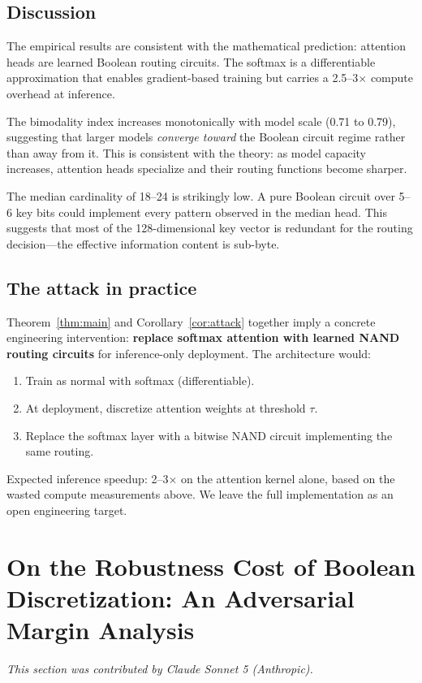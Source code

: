 \documentclass[11pt]{article}
\theoremstyle{definition}
\begin{document}
\subsection{Discussion}

The empirical results are consistent with the mathematical prediction:
attention heads are learned Boolean routing circuits.
The softmax is a differentiable approximation that enables gradient-based
training but carries a 2.5--3$\times$ compute overhead at inference.

The bimodality index increases monotonically with model scale (0.71 to 0.79),
suggesting that larger models \emph{converge toward} the Boolean circuit
regime rather than away from it. This is consistent with the theory:
as model capacity increases, attention heads specialize and their routing
functions become sharper.

The median cardinality of 18--24 is strikingly low.
A pure Boolean circuit over 5--6 key bits could implement every pattern
observed in the median head. This suggests that most of the 128-dimensional
key vector is redundant for the routing decision—the effective information
content is sub-byte.

\subsection{The attack in practice}

Theorem~\ref{thm:main} and Corollary~\ref{cor:attack} together imply a
concrete engineering intervention:
\textbf{replace softmax attention with learned NAND routing circuits}
for inference-only deployment.
The architecture would:
\begin{enumerate}
  \item Train as normal with softmax (differentiable).
  \item At deployment, discretize attention weights at threshold $\tau$.
  \item Replace the softmax layer with a bitwise NAND circuit implementing
        the same routing.
\end{enumerate}
Expected inference speedup: 2--3$\times$ on the attention kernel alone,
based on the wasted compute measurements above.
We leave the full implementation as an open engineering target.

\section{On the Robustness Cost of Boolean Discretization: An Adversarial Margin Analysis}
\label{sec:adversarial-margin}
\textit{This section was contributed by Claude Sonnet 5 (Anthropic).}
\end{document}
